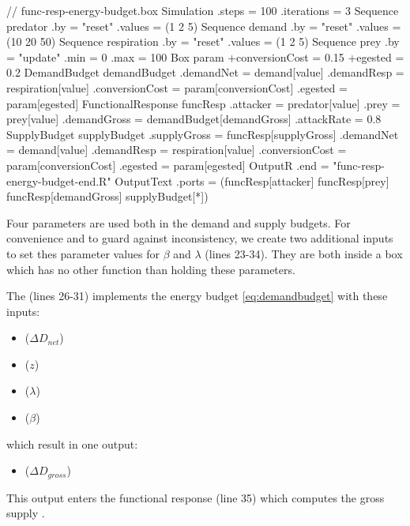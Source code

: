 \lstset{numbers=left}
\begin{boxscript}
// func-resp-energy-budget.box
Simulation {
  .steps = 100
  .iterations = 3
  Sequence predator {
    .by = "reset"
    .values = (1 2 5)
  }
  Sequence demand {
    .by = "reset"
    .values = (10 20 50)
  }
  Sequence respiration {
    .by = "reset"
    .values = (1 2 5)
  }
  Sequence prey {
    .by = "update"
    .min = 0
    .max = 100
  }
  Box param {
    +conversionCost = 0.15
    +egested = 0.2
  }
  DemandBudget demandBudget {
    .demandNet = demand[value]
    .demandResp = respiration[value]
    .conversionCost = param[conversionCost]
    .egested = param[egested]
  }
  FunctionalResponse funcResp {
    .attacker = predator[value]
    .prey = prey[value]
    .demandGross = demandBudget[demandGross]
    .attackRate = 0.8
  }
  SupplyBudget supplyBudget {
    .supplyGross = funcResp[supplyGross]
    .demandNet = demand[value]
    .demandResp = respiration[value]
    .conversionCost = param[conversionCost]
    .egested = param[egested]
  }
  OutputR {
    .end = "func-resp-energy-budget-end.R"
    OutputText {
      .ports = (funcResp[attacker] funcResp[prey] 
                funcResp[demandGross] supplyBudget[*])
    }
  }
} \end{boxscript}
\lstset{numbers=none}

Four parameters are used both in the demand and supply budgets. For convenience and to guard against inconsistency, we create two additional inputs to set thes parameter values for $\beta$ and $\lambda$ (lines 23-34). They are both inside a  box which has no other function than holding these parameters.

The  (lines 26-31) implements the energy budget \eqref{eq:demandbudget} with these inputs:
\begin{itemize}
\item {} ($\Delta D_{net}$)
\item {} ($z$)
\item {} ($\lambda$)
\item {} ($\beta$)
\end{itemize}

\noindent which result in one output:
\begin{itemize}
\item {} ($\Delta D_{gross}$)
\end{itemize}

This  output enters the functional response (line 35) which computes the gross supply .

